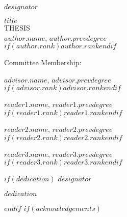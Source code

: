 \documentclass[12pt,letterpaper,toc=flat,oneside]{book}
\begin{document}
	\thispagestyle{empty}
	\setcounter{page}{3}
	\noindent $designator$
	\vfill
	\begin{center}
	    \MakeUppercase{$title$}\\[10pt]
	    \MakeUppercase{thesis}\\[10pt]
	    
	    \begingroup
  \singlespace
    $author.name$, $author.prevdegree$\\ 
    $if(author.rank)$$author.rank$$endif$
    \par
  \endgroup
  
	\bigskip\medskip
	Committee Membership:
	\bigskip\medskip
	
	\begingroup
  \singlespace
    $advisor.name$, $advisor.prevdegree$\\ 
    $if(advisor.rank)$$advisor.rank$$endif$
    \par
  \endgroup
  \bigskip\bigskip
  
  \begingroup
  \singlespace
    $reader1.name$, $reader1.prevdegree$\\ 
    $if(reader1.rank)$$reader1.rank$$endif$
    \par
  \endgroup
  \bigskip\bigskip
  
  \begingroup
  \singlespace
    $reader2.name$, $reader2.prevdegree$\\ 
    $if(reader2.rank)$$reader2.rank$$endif$
    \par
  \endgroup
  \bigskip\bigskip
  
  \begingroup
  \singlespace
    $reader3.name$, $reader3.prevdegree$\\ 
    $if(reader3.rank)$$reader3.rank$$endif$
    \par
  \endgroup
	\end{center}
	\vfill
	\newpage
$if(dedication)$
       \noindent 
       $designator$
       \vfill
       \begin{center}
	   \em{$dedication$}
	   \end{center}
	   \vfill
      \newpage
$endif$
$if(acknowledgements)$
\newenvironment{acknowledgements}{\ackhead}{\acktail}
\newenvironment{acknowledgments}{\ackhead}{\acktail}
\end{document}
